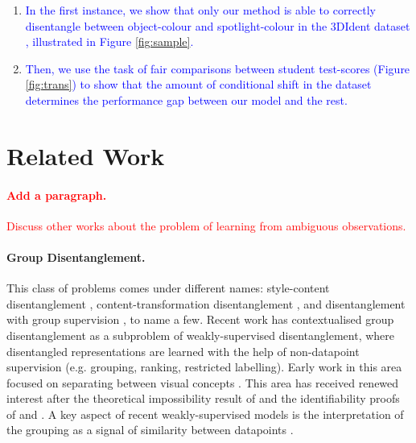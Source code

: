 \documentclass{article} %
\newcommand{\change}[1]{\textcolor{blue}{#1}}
\newcommand{\todo}[1]{\textcolor{red}{#1}}
\begin{document}
\begin{enumerate}
\item \change{In the first instance, we show that only our method is able to correctly disentangle between object-colour and spotlight-colour in the 3DIdent dataset \citep{Zimmerman2021Contrastive},  illustrated in Figure \ref{fig:sample}. }
\item \change{Then, we use the task of fair comparisons between student test-scores (Figure \ref{fig:trans}) to show that the amount of conditional shift in the dataset determines the performance gap between our model and the rest.}
\end{enumerate}

\section{Related Work}

\todo{\paragraph{Add a paragraph.} Discuss other works about the problem of learning from ambiguous observations.}

\paragraph{Group Disentanglement.} This class of problems comes under different names: style-content disentanglement \citep{Tenenbaum2000SeparatingSA}, content-transformation disentanglement \citep{Hosoya2019GroupbasedLO},  and disentanglement with group supervision \citep{Shu2020Weakly}, to name a few. Recent work \citep{Shu2020Weakly, Locatello2020WeaklySupervisedDW} has contextualised group disentanglement as a subproblem of weakly-supervised disentanglement, where disentangled representations are learned with the help of non-datapoint supervision (e.g. grouping, ranking, restricted labelling). Early work in this area focused on separating between visual concepts \citep{Kulkarni2015DeepCI, Reed2015DeepVA}. This area has received renewed interest after the theoretical impossibility result of \citet{Locatello2019ChallengingCA} and the identifiability proofs of \citet{Khemakhem2020VariationalAA} and \citet{Mita2021AnID}. A key aspect of recent weakly-supervised models is the interpretation of the grouping as a signal of similarity between datapoints \citep{Chen2020WeaklySD}. 

\end{document}

